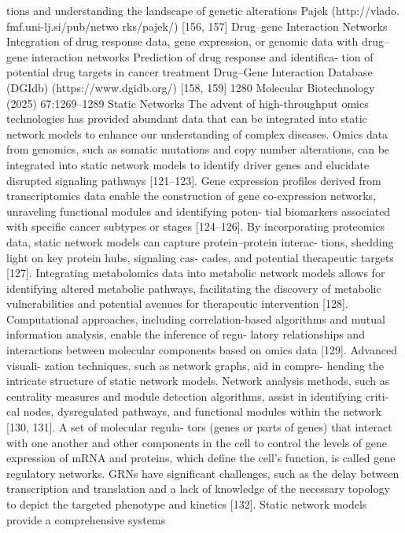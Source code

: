 tions and understanding the landscape of
genetic alterations
Pajek (http://​vlado.​fmf.​uni-​lj.​si/​pub/​netwo​
rks/​pajek/)
[156, 157]
Drug–gene Interaction Networks
Integration of drug response data, gene
expression, or genomic data with drug–
gene interaction networks
Prediction of drug response and identifica-
tion of potential drug targets in cancer
treatment
Drug–Gene Interaction Database (DGIdb)
(https://​www.​dgidb.​org/)
[158, 159]
1280
Molecular Biotechnology (2025) 67:1269–1289
Static Networks
The advent of high-throughput omics technologies has
provided abundant data that can be integrated into static
network models to enhance our understanding of complex
diseases. Omics data from genomics, such as somatic
mutations and copy number alterations, can be integrated
into static network models to identify driver genes and
elucidate disrupted signaling pathways [121–123]. Gene
expression profiles derived from transcriptomics data
enable the construction of gene co-expression networks,
unraveling functional modules and identifying poten-
tial biomarkers associated with specific cancer subtypes
or stages [124–126]. By incorporating proteomics data,
static network models can capture protein–protein interac-
tions, shedding light on key protein hubs, signaling cas-
cades, and potential therapeutic targets [127]. Integrating
metabolomics data into metabolic network models allows
for identifying altered metabolic pathways, facilitating
the discovery of metabolic vulnerabilities and potential
avenues for therapeutic intervention [128]. Computational
approaches, including correlation-based algorithms and
mutual information analysis, enable the inference of regu-
latory relationships and interactions between molecular
components based on omics data [129]. Advanced visuali-
zation techniques, such as network graphs, aid in compre-
hending the intricate structure of static network models.
Network analysis methods, such as centrality measures and
module detection algorithms, assist in identifying criti-
cal nodes, dysregulated pathways, and functional modules
within the network [130, 131]. A set of molecular regula-
tors (genes or parts of genes) that interact with one another
and other components in the cell to control the levels of
gene expression of mRNA and proteins, which define the
cell’s function, is called gene regulatory networks. GRNs
have significant challenges, such as the delay between
transcription and translation and a lack of knowledge of
the necessary topology to depict the targeted phenotype
and kinetics [132].
Static network models provide a comprehensive systems
